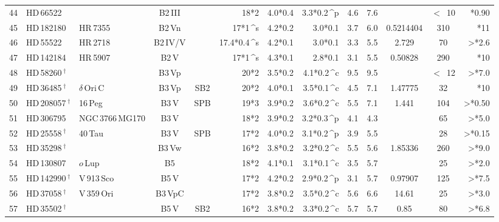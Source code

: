 \begin{longtable}{l l l c c D{*}{\,\pm\,}{4,4} D{*}{\,\pm\,}{4,4} D{*}{\,\pm\,}{6,6} c c c c D{*}{\,}{2,4} }
44 & HD\,66522 &   & B2\,III &  &18*2 & 4.0*0.4 & 3.3*0.2\,^{p} & 4.6 & 7.6 &   & $<$~10 & *0.90 \\ 

45 & HD\,182180 & HR\,7355 & B2\,Vn &  &17*1\,^{s} & 4.2*0.2 & 3.0*0.1 & 3.7 & 6.0 & 0.5214404 & 310 & *11 \\ 

46 & HD\,55522 & HR\,2718 & B2\,IV/V &  &17.4*0.4\,^{s} & 4.2*0.1 & 3.0*0.1 & 3.3 & 5.5 & 2.729 & 70 & >*2.6 \\ 

47 & HD\,142184 & HR\,5907 & B2\,V &  &17*1\,^{s} & 4.3*0.1 & 2.8*0.1 & 3.1 & 5.5 & 0.50828 & 290 & *10 \\ 

48 & HD\,58260\,$^\dagger$ &   & B3\,Vp &  &20*2 & 3.5*0.2 & 4.1*0.2\,^{c} & 9.5 & 9.5 &   & $<$~12 & >*7.0 \\ 

49 & HD\,36485\,$^\dagger$ & $\delta$\,Ori\,C & B3\,Vp & SB2 &20*2 & 4.0*0.1 & 3.5*0.1\,^{c} & 4.5 & 7.1 & 1.47775 & 32 & *10 \\ 

50 & HD\,208057\,$^\dagger$ & 16\,Peg & B3\,V & SPB &19*3 & 3.9*0.2 & 3.6*0.2\,^{c} & 5.5 & 7.1 & 1.441 & 104 & >*0.50 \\ 

51 & HD\,306795 & NGC\,3766\,MG170 & B3\,V &  &18*2 & 3.9*0.2 & 3.2*0.3\,^{p} & 4.1 & 4.3 &   & 65 & >*5.0 \\ 

52 & HD\,25558\,$^\dagger$ & 40\,Tau & B3\,V & SPB &17*2 & 4.0*0.2 & 3.1*0.2\,^{p} & 3.9 & 5.5 &   & 28 & >*0.15 \\ 

53 & HD\,35298\,$^\dagger$ &   & B3\,Vw &  &16*2 & 3.8*0.2 & 3.2*0.2\,^{c} & 5.5 & 5.6 & 1.85336 & 260 & >*9.0 \\ 

54 & HD\,130807 & $o$\,Lup & B5 &  &18*2 & 4.1*0.1 & 3.1*0.1\,^{c} & 3.5 & 5.7 &   & 25 & >*2.0 \\ 

55 & HD\,142990\,$^\dagger$ & V\,913\,Sco & B5\,V &  &17*2 & 4.2*0.2 & 2.9*0.2\,^{p} & 3.1 & 5.7 & 0.97907 & 125 & >*7.5 \\ 

56 & HD\,37058\,$^\dagger$ & V\,359\,Ori & B3\,VpC &  &17*2 & 3.8*0.2 & 3.5*0.2\,^{c} & 5.6 & 6.6 & 14.61 & 25 & >*3.0 \\ 

57 & HD\,35502\,$^\dagger$ &   & B5\,V & SB2 &16*2 & 3.8*0.2 & 3.3*0.2\,^{c} & 5.7 & 5.7 & 0.85 & 80 & >*6.8 \\ 


\end{longtable}
